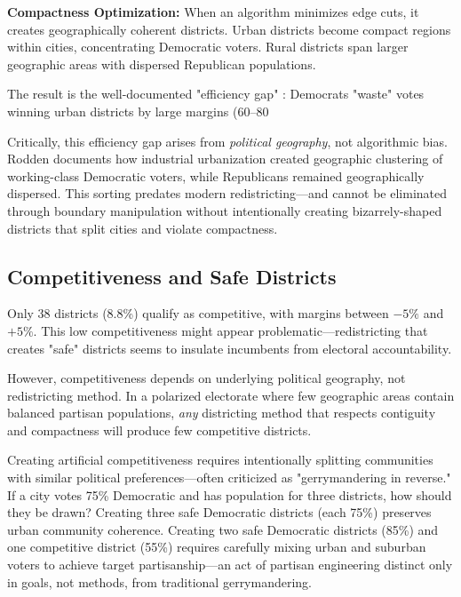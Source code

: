 \textbf{Compactness Optimization:} When an algorithm minimizes edge cuts, it creates geographically coherent districts. Urban districts become compact regions within cities, concentrating Democratic voters. Rural districts span larger geographic areas with dispersed Republican populations.

The result is the well-documented "efficiency gap" \cite{stephanopoulos2015partisan}: Democrats "waste" votes winning urban districts by large margins (60--80%

Critically, this efficiency gap arises from \textit{political geography}, not algorithmic bias. Rodden \cite{rodden2019why} documents how industrial urbanization created geographic clustering of working-class Democratic voters, while Republicans remained geographically dispersed. This sorting predates modern redistricting—and cannot be eliminated through boundary manipulation without intentionally creating bizarrely-shaped districts that split cities and violate compactness.

\subsection{Competitiveness and Safe Districts}

Only 38 districts (8.8\%) qualify as competitive, with margins between $-5\%$ and $+5\%$. This low competitiveness might appear problematic—redistricting that creates "safe" districts seems to insulate incumbents from electoral accountability.

However, competitiveness depends on underlying political geography, not redistricting method. In a polarized electorate where few geographic areas contain balanced partisan populations, \textit{any} districting method that respects contiguity and compactness will produce few competitive districts.

Creating artificial competitiveness requires intentionally splitting communities with similar political preferences—often criticized as "gerrymandering in reverse." If a city votes 75\% Democratic and has population for three districts, how should they be drawn? Creating three safe Democratic districts (each 75\%) preserves urban community coherence. Creating two safe Democratic districts (85\%) and one competitive district (55\%) requires carefully mixing urban and suburban voters to achieve target partisanship—an act of partisan engineering distinct only in goals, not methods, from traditional gerrymandering.

